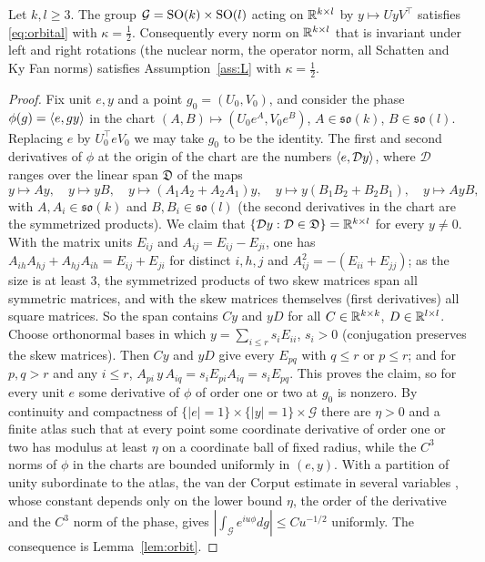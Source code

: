 \begin{lemma}\label{lem:matrices}
Let $k,l\ge3$. The group $\mathcal G=\mathrm{SO}(k)\times\mathrm{SO}(l)$ acting on $\mathbb{R}^{k\times l}$ by $y\mapsto Uy V^\top$ satisfies
\eqref{eq:orbital} with $\kappa=\frac12$. Consequently every norm on $\mathbb{R}^{k\times l}$ that is invariant under left and
right rotations (the nuclear norm, the operator norm, all Schatten and Ky Fan norms) satisfies
Assumption~\ref{ass:L} with $\kappa=\frac12$.
\end{lemma}
\begin{proof}
Fix unit $e,y$ and a point $g_0=(U_0,V_0)$, and consider the phase $\phi(g)=\langle e, gy\rangle$ in the chart
$(A,B)\mapsto(U_0e^{A},V_0e^{B})$, $A\in\mathfrak{so}(k)$, $B\in\mathfrak{so}(l)$. Replacing $e$ by $U_0^\top eV_0$ we may
take $g_0$ to be the identity. The first and second derivatives of $\phi$ at the origin of the chart are the numbers
$\langle e, \mathcal Dy\rangle$, where $\mathcal D$ ranges over the linear span $\mathfrak D$ of the maps
\[
y\mapsto Ay,\quad y\mapsto yB,\quad y\mapsto(A_1A_2+A_2A_1)y,\quad y\mapsto y(B_1B_2+B_2B_1),\quad y\mapsto AyB,
\]
with $A,A_i\in\mathfrak{so}(k)$ and $B,B_i\in\mathfrak{so}(l)$ (the second derivatives in the chart are the symmetrized products).
We claim that $\{\mathcal Dy:\mathcal D\in\mathfrak D\}=\mathbb{R}^{k\times l}$ for every $y\ne0$. With the matrix units
$E_{ij}$ and $A_{ij}=E_{ij}-E_{ji}$, one has $A_{ih}A_{hj}+A_{hj}A_{ih}=E_{ij}+E_{ji}$ for distinct $i,h,j$ and
$A_{ij}^2=-(E_{ii}+E_{jj})$; as the size is at least $3$, the symmetrized products of two skew matrices span all
symmetric matrices, and with the skew matrices themselves (first derivatives) all square matrices. So the
span contains $Cy$ and $yD$ for all $C\in\mathbb{R}^{k\times k}$, $D\in\mathbb{R}^{l\times l}$. Choose orthonormal bases in which
$y=\sum_{i\le r}s_iE_{ii}$, $s_i>0$ (conjugation preserves the skew matrices). Then $Cy$ and $yD$ give every $E_{pq}$
with $q\le r$ or $p\le r$; and for $p,q>r$ and any $i\le r$, $A_{pi}\,y\,A_{iq}=s_iE_{pi}A_{iq}=s_iE_{pq}$. This proves the
claim, so for every unit $e$ some derivative of $\phi$ of order one or two at $g_0$ is nonzero. By continuity and
compactness of $\{|e|=1\}\times\{|y|=1\}\times\mathcal G$ there are $\eta>0$ and a finite atlas such that at every point
some coordinate derivative of order one or two has modulus at least $\eta$ on a coordinate ball of fixed radius, while
the $C^3$ norms of $\phi$ in the charts are bounded uniformly in $(e,y)$. With a partition of unity subordinate to the
atlas, the van der Corput estimate in several variables \citep[Ch.~VIII, \S2.2, Prop.~5]{stein}, whose constant depends
only on the lower bound $\eta$, the order of the derivative and the $C^{3}$ norm of the phase, gives
$|\int_{\mathcal G}e^{iu\phi}dg|\le Cu^{-1/2}$ uniformly. The consequence is Lemma~\ref{lem:orbit}.
\end{proof}

